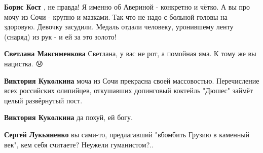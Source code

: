 \begin{itemize}
\begin{itemize}
 
\textbf{Борис Кост} , не правда! Я именно об Авериной - конкретно и чётко. А вы
про мочу из Сочи - крупно и мазками. Так что не надо с больной головы на
здоровую. Девочку засудили. Медаль отдали человеку, уронившему ленту (снаряд)
из рук - и ей за это золото!


\textbf{Светлана Максименкова} Светлана, у вас не рот, а помойная яма. К тому же вы нацистка. 😞

 
\textbf{Виктория Куколкина} моча из Сочи прекрасна своей массовостью. Перечисление всех российских олипийцев, откушавших допинговый коктейль "Дюшес" займёт целый развёрнутый пост.

 
\textbf{Виктория Куколкина}
да похуй, ей богу.

 
\textbf{Сергей Лукьяненко} вы сами-то, предлагавший "вбомбить Грузию в каменный век", кем себя считаете? Неужели гуманистом?..

 

\end{itemize}
\end{itemize}
